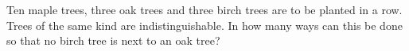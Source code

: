 Ten maple trees, three oak trees and three birch trees are to be planted in a row. Trees of the same kind are indistinguishable. In how many ways can this be done so that no birch tree is next to an oak tree?
